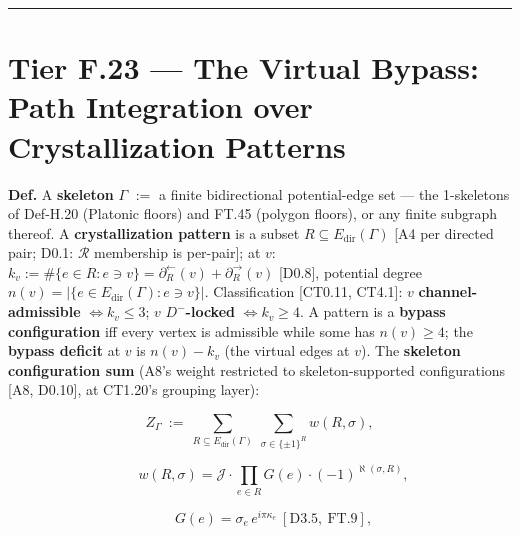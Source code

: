 \begin{theorem}
\vspace{2pt}\noindent\rule{\textwidth}{0.4pt}\vspace{2pt}

\end{theorem}

\section[Tier F.23 — The Virtual Bypass: Path Integration over…]{\texorpdfstring{Tier F.23 — The Virtual Bypass: Path Integration over Crystallization Patterns}{Tier F.23 - The Virtual Bypass: Path Integration over Crystallization Patterns}}

\begin{definition}\label{tag:Def-H-25}
\textbf{Def.} A \textbf{skeleton} $\Gamma$ $:=$ a finite bidirectional potential-edge set — the 1-skeletons of Def-H.20 (Platonic floors) and FT.45 (polygon floors), or any finite subgraph thereof. A \textbf{crystallization pattern} is a subset $R\subseteq E_{\mathrm{dir}}(\Gamma)$ [A4 per directed pair; D0.1: $\mathcal R$ membership is per-pair]; at $v$: $k_v:=\#\{e\in R: e\ni v\}=\partial^{\leftarrow}_R(v)+\partial^{\rightarrow}_R(v)$ [D0.8], potential degree $n(v)=| \{e\in E_{\mathrm{dir}}(\Gamma): e\ni v\} |$. Classification [CT0.11, CT4.1]: $v$ \textbf{channel-admissible} $\iff k_v\le3$; $v$ \textbf{$D^-$-locked} $\iff k_v\ge4$. A pattern is a \textbf{bypass configuration} iff every vertex is admissible while some has $n(v)\ge4$; the \textbf{bypass deficit} at $v$ is $n(v)-k_v$ (the virtual edges at $v$). The \textbf{skeleton configuration sum} (A8's weight restricted to skeleton-supported configurations [A8, D0.10], at CT1.20's grouping layer):

\[
Z_\Gamma\ :=\ \sum_{R\subseteq E_{\mathrm{dir}}(\Gamma)}\ \sum_{\sigma\in\{\pm1\}^R} w(R,\sigma),
\]

\[
\qquad w(R,\sigma)=\mathcal J\cdot\prod_{e\in R}G(e)\cdot(-1)^{\aleph(\sigma,R)},
\]

\[
\qquad G(e)=\sigma_e\,e^{i\pi\kappa_e}\ [\mathrm{D3.5},\ \mathrm{FT.9}],
\]


\end{definition}
